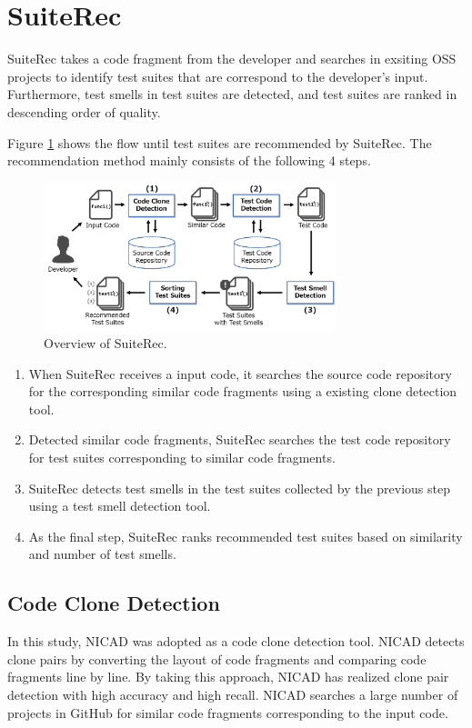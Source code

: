 \documentclass[conference]{IEEEtran}
\begin{document}
\section{SuiteRec}
SuiteRec takes a code fragment from the developer and searches in exsiting OSS projects to identify test suites that are correspond to the developer’s input. Furthermore, test smells in test suites are detected, and test suites are ranked in descending order of quality.

Figure \ref{fig1} shows the flow until test suites are recommended by SuiteRec. The recommendation method mainly consists of the following 4 steps.


\begin{figure}[htbp]
\centerline{\includegraphics[width=8.5cm]{SuiteRec-outline.pdf}}
\caption{Overview of SuiteRec.}
\label{fig1}
\end{figure}

\begin{enumerate}
\renewcommand{\labelenumi}{(\arabic{enumi})}
\item When SuiteRec receives a input code, it searches the source code repository for the corresponding similar code fragments using a existing clone detection tool.
\item Detected similar code fragments, SuiteRec searches the test code repository for test suites corresponding to similar code fragments.
\item SuiteRec detects test smells in the test suites collected by the previous step using a test smell detection tool.
\item As the final step, SuiteRec ranks recommended test suites based on similarity and number of test smells.
\end{enumerate}


\subsection{Code Clone Detection}
In this study, NICAD\cite{b2} was adopted as a code clone detection tool. NICAD detects clone pairs by converting the layout of code fragments and comparing code fragments line by line. By taking this approach, NICAD has realized clone pair detection with high accuracy and high recall. NICAD searches a large number of projects in GitHub for similar code fragments corresponding to the input code.
\end{document}

